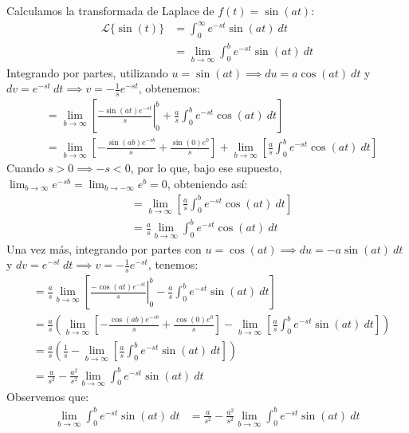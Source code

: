 \documentclass[12pt, a4paper]{article}
\begin{document}
Calculamos la transformada de Laplace de \(f(t) = \sin(at)\):
\begin{align*}
	\mathcal{L}\{\sin (t)\} &= \int_{0}^{\infty} e^{-st} \sin(at)\ dt \\
	&= \lim_{b \to \infty} \int_{0}^{b} e^{-st} \sin(at)\ dt
\end{align*}
Integrando por partes, utilizando \(u = \sin(at) \implies du = a \cos(at)\ dt\) y \(dv = e^{-st}\ dt \implies v = -\frac{1}{s} e^{-st}\), obtenemos:
\begin{align*}
	&= \lim_{b \to \infty} \left[ \left. \frac{-\sin (at) e^{-st}}{s} \right|_{0}^{b} + \frac{a}{s} \int_{0}^{b} e^{-st} \cos (at) \ dt \right] \\
	&= \lim_{b \to \infty} \left[ - \frac{\sin (ab) e^{-sb}}{s} + \frac{\sin (0) e^{0}}{s} \right] + \lim_{b \to \infty} \left[ \frac{a}{s} \int_{0}^{b} e^{-st} \cos (at) \ dt \right]
\end{align*}
Cuando \(s > 0 \implies -s < 0\), por lo que, bajo ese supuesto, \(\lim_{b \to \infty} e^{-sb} = \lim_{b \to -\infty} e^{b} = 0\), obteniendo así:
\begin{align*}
	&= \lim_{b \to \infty} \left[ \frac{a}{s} \int_{0}^{b} e^{-st} \cos (at) \ dt \right] \\
	&= \frac{a}{s} \lim_{b \to \infty} \int_{0}^{b} e^{-st} \cos (at) \ dt
\end{align*}
Una vez más, integrando por partes con \(u = \cos (at) \implies du = - a\sin (at)\ dt\) y \(dv = e^{-st}\ dt \implies v = -\frac{1}{s} e^{-st}\), tenemos:
\begin{align*}
	&= \frac{a}{s} \lim_{b \to \infty} \left[ \left. \frac{-\cos (at) e^{-st}}{s} \right|_{0}^{b} - \frac{a}{s} \int_{0}^{b} e^{-st} \sin (at)\ dt \right] \\
	&= \frac{a}{s} \left( \lim_{b \to \infty} \left[ - \frac{\cos (ab) e^{-sb}}{s} + \frac{\cos (0) e^{0}}{s} \right] - \lim_{b \to \infty} \left[ \frac{a}{s} \int_{0}^{b} e^{-st} \sin (at)\ dt \right] \right) \\
	&= \frac{a}{s} \left( \frac{1}{s} - \lim_{b \to \infty} \left[ \frac{a}{s} \int_{0}^{b} e^{-st} \sin (at)\ dt \right] \right) \\
	&= \frac{a}{s ^{2}} - \frac{a^{2}}{s ^{2}} \lim_{b \to \infty} \int_{0}^{b} e^{-st} \sin (at) \ dt
\end{align*}
Observemos que:
\begin{align*}
	\lim_{b \to \infty} \int_{0}^{b} e^{-st} \sin (at) \ dt &= \frac{a}{s ^{2}} - \frac{a^{2}}{s ^{2}} \lim_{b \to \infty} \int_{0}^{b} e^{-st} \sin (at) \ dt
\end{align*}
\end{document}
